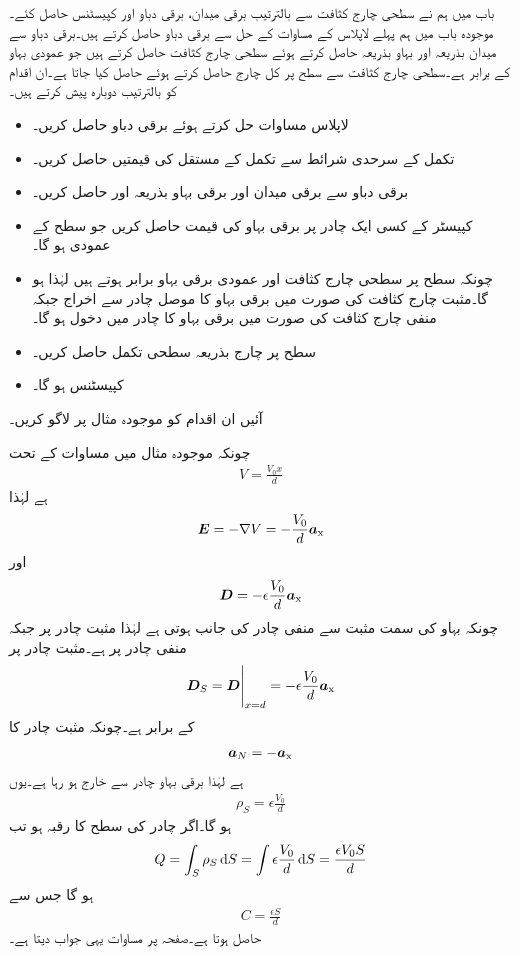 باب  میں ہم نے سطحی چارج کثافت سے بالترتیب برقی میدان، برقی دباو اور کپیسٹنس حاصل کئے۔موجودہ باب میں ہم پہلے لاپلاس کے مساوات کے حل سے برقی دباو حاصل کرتے ہیں۔برقی دباو سے میدان بذریعہ   اور بہاو بذریعہ  حاصل کرتے ہوئے سطحی چارج کثافت حاصل کرتے ہیں جو عمودی بہاو کے برابر ہے۔سطحی چارج کثافت سے سطح پر کل چارج حاصل کرتے ہوئے  حاصل کیا جاتا ہے۔ان اقدام کو بالترتیب دوبارہ پیش کرتے ہیں۔
\begin{itemize}
\item
لاپلاس مساوات حل کرتے ہوئے برقی دباو  حاصل کریں۔
\item
تکمل کے سرحدی شرائط سے تکمل کے مستقل کی قیمتیں حاصل کریں۔
\item
برقی دباو سے برقی میدان اور برقی بہاو  بذریعہ  اور  حاصل کریں۔
\item
کپیسٹر کے کسی ایک چادر پر برقی بہاو کی قیمت  حاصل کریں جو سطح کے عمودی ہو گا۔ 
\item
چونکہ سطح پر سطحی چارج کثافت اور عمودی برقی بہاو برابر ہوتے ہیں لہٰذا  ہو گا۔مثبت چارج کثافت کی صورت میں برقی بہاو کا موصل چادر سے اخراج جبکہ منفی چارج کثافت کی صورت میں برقی بہاو کا چادر میں دخول ہو گا۔
\item
سطح پر چارج بذریعہ سطحی تکمل حاصل کریں۔
\item
کپیسٹنس  ہو گا۔
\end{itemize}
آئیں ان اقدام کو موجودہ مثال پر لاگو کریں۔

چونکہ موجودہ مثال میں مساوات  کے تحت
\begin{align*}
V=\frac{V_0x}{d}
\end{align*}
ہے لہٰذا
\begin{align*}
{\ensuremath{{\boldsymbol{E}}}}=-\nabla V=-\frac{V_0}{d}{\boldsymbol{a}}_{\textup{x}}
\end{align*}
اور
\begin{align*}
{\ensuremath{{\boldsymbol{D}}}}=-\epsilon \frac{V_0}{d}{\boldsymbol{a}}_{\textup{x}}
\end{align*}
چونکہ بہاو کی سمت مثبت سے منفی چادر کی جانب ہوتی ہے لہٰذا مثبت چادر  پر جبکہ منفی چادر  پر ہے۔مثبت چادر پر
\begin{align*}
\kvec{D}_S=\eval{\kvec{D}}_{x=d}=-\epsilon \frac{V_0}{d}\ax
\end{align*}
کے برابر ہے۔چونکہ مثبت چادر کا
\begin{align*}
{\boldsymbol{a}}_N=-{\boldsymbol{a}}_{\textup{x}}
\end{align*}
ہے لہٰذا برقی بہاو چادر سے خارج ہو رہا ہے۔یوں
\begin{align*}
\rho_S=\epsilon \frac{V_0}{d}
\end{align*}
ہو گا۔اگر چادر کی سطح کا رقبہ  ہو تب
\begin{align*}
Q=\int_S \rho_S \dif S=\int \epsilon \frac{V_0}{d} \dif S=\frac{\epsilon V_0 S}{d}
\end{align*}
ہو گا جس سے
\begin{align*}
C=\frac{\epsilon S}{d}
\end{align*}
حاصل ہوتا ہے۔صفحہ  پر مساوات  یہی جواب دیتا ہے۔

